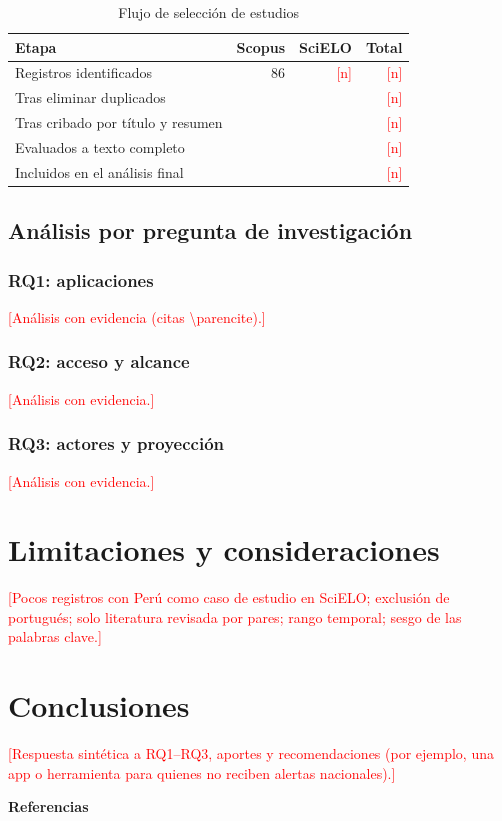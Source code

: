 \documentclass[12pt,a4paper]{article}
\newcommand{\relleno}[1]{\textcolor{red}{[#1]}}
\begin{document}
\begin{table}[ht]
  \centering
  \caption{Flujo de selección de estudios}
  \label{tab:flujo}
  \begin{tabular}{@{}lrrr@{}}
    \toprule
    Etapa & Scopus & SciELO & Total \\
    \midrule
    Registros identificados & 86 & \relleno{n} & \relleno{n} \\
    Tras eliminar duplicados & & & \relleno{n} \\
    Tras cribado por título y resumen & & & \relleno{n} \\
    Evaluados a texto completo & & & \relleno{n} \\
    Incluidos en el análisis final & & & \relleno{n} \\
    \bottomrule
  \end{tabular}
\end{table}

\subsection{Análisis por pregunta de investigación}
\subsubsection{RQ1: aplicaciones}
\relleno{Análisis con evidencia (citas \textbackslash parencite).}
\subsubsection{RQ2: acceso y alcance}
\relleno{Análisis con evidencia.}
\subsubsection{RQ3: actores y proyección}
\relleno{Análisis con evidencia.}

\section{Limitaciones y consideraciones}
\relleno{Pocos registros con Perú como caso de estudio en SciELO; exclusión de portugués; solo literatura revisada por pares; rango temporal; sesgo de las palabras clave.}

\section{Conclusiones}
\relleno{Respuesta sintética a RQ1--RQ3, aportes y recomendaciones (por ejemplo, una app o herramienta para quienes no reciben alertas nacionales).}

\newpage
\begin{center}\textbf{Referencias}\end{center}
\printbibliography[heading=none]
\end{document}

